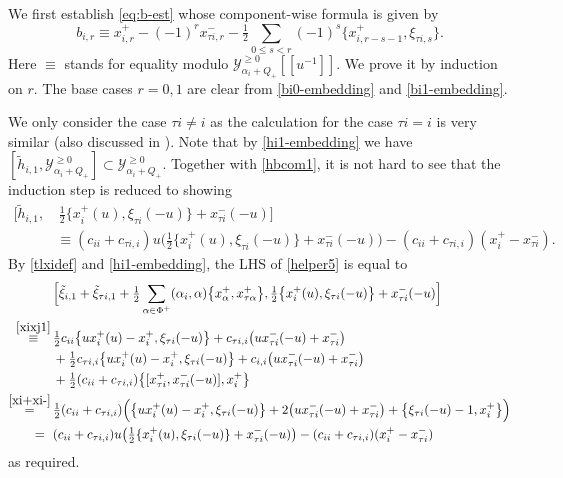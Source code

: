 \documentclass[11pt,reqno]{amsart}
\numberwithin{equation}{section}
\theoremstyle{definition}
\theoremstyle{remark}
\newcommand{\beq}{\begin{equation}}
\newcommand{\eeq}{\end{equation}}
\newcommand{\be}{\begin{equation*}}
\newcommand{\ee}{\end{equation*}}
\newcommand{\hf}{\tfrac12}
\newcommand{\tl}{\tilde}
\newcommand{\gge}{\geqslant}
\newcommand{\lle}{\leqslant}
\newcommand{\Y}{{\mathscr{Y}}}
\begin{document}
\subsubsection{}\label{ssec:b-est} We first establish \eqref{eq:b-est} whose component-wise formula is given by
\be
b_{i,r}\equiv x_{i,r}^+-(-1)^rx_{\tau i,r}^--\tfrac12\sum_{0\lle s<r}(-1)^s \{x_{i,r-s-1}^+,\xi_{\tau i,s} \}.
\ee
Here $\equiv$ stands for equality modulo $\Y_{\alpha_i+Q_+}^{\gge 0}[\![u^{-1}]\!]$. We prove it by induction on $r$. The base cases $r=0,1$ are clear from \eqref{bi0-embedding} and \eqref{bi1-embedding}. 

We only consider the case $\tau i\ne i$ as the calculation for the case $\tau i=i$ is very similar (also discussed in \cite{Lu26min}). Note that by \eqref{hi1-embedding} we have $[\tl h_{i,1},\Y_{\alpha_i+Q_+}^{\gge 0}]\subset \Y_{\alpha_i+Q_+}^{\gge 0}$. Together with \eqref{hbcom1}, it is not hard to see that the induction step is reduced to showing
\beq\label{helper5}
\begin{split}
\big[\tl h_{i,1},&\,\tfrac12 \{x_i^+(u),\xi_{\tau i}(-u)\}+x_{\tau i}^-(-u)\big]\\
&\equiv (c_{ii}+c_{\tau i,i})u\big(\tfrac12\{x_i^+(u),\xi_{\tau i}(-u)\}+x_{\tau i}^-(-u)\big)-(c_{ii}+c_{\tau i,i})(x_i^+-x_{\tau i}^-).
\end{split}
\eeq
By \eqref{tlxidef} and \eqref{hi1-embedding}, the LHS of \eqref{helper5} is equal to
\begin{align*}
&\Big[\tl\xi_{i,1}+\tl\xi_{\tau i,1}+\hf \sum_{\alpha\in\Phi^+}(\alpha_i,\alpha)\big\{x_\alpha^+,x_{\tau\alpha}^+\big\},\tfrac12 \big\{x_i^+(u),\xi_{\tau i}(-u)\big\}+x_{\tau i}^-(-u)\Big]\\
\stackrel{\eqref{xixj1}}{\equiv}\,&\hf c_{ii}\big\{ux_i^{+}(u)-x_i^+,\xi_{\tau i}(-u)\big\}+ c_{\tau i,i}\big(ux_{\tau i}^-(-u)+x_{\tau i}^-\big)
\\ \hskip0.22cm&
+\hf c_{\tau i,i}\big\{ux_i^{+}(u)-x_i^+,\xi_{\tau i}(-u)\big\}+ c_{i,i}\big(ux_{\tau i}^-(-u)+x_{\tau i}^-\big)\\
\hskip0.22cm&+\hf(c_{ii}+c_{\tau i,i})\big\{[x_{\tau i}^+,x_{\tau i}^-(-u)],x_i^+\big\}\\
\stackrel{\eqref{xi+xi-}}{=}\,&\hf(c_{ii}+c_{\tau i,i})\Big(\big\{ux_i^{+}(u)-x_i^+,\xi_{\tau i}(-u)\big\}+ 2\big(ux_{\tau i}^-(-u)+x_{\tau i}^-\big)+\big\{\xi_{\tau i}(-u)-1,x_i^+\big\}\Big)\\
=\hskip0.22cm&(c_{ii}+c_{\tau i,i})u\big(\tfrac12\{x_i^+(u),\xi_{\tau i}(-u)\}+x_{\tau i}^-(-u)\big)-(c_{ii}+c_{\tau i,i})(x_i^+-x_{\tau i}^-)
\end{align*}
as required.
\end{document}
